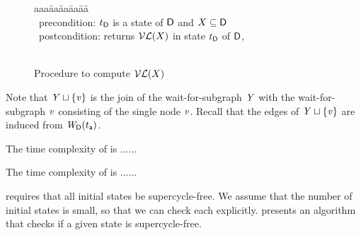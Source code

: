 \begin{figure}[H]
\setcounter{lctr}{0}
\begin{tabbing}\label{alg:compute-lfp}
aaa\= aa\= aa\= aa\= aa\=\kill
{}\\
\cmnt\ precondition: $t_\DS$ is a state of $\dsk{\act}{\l}$ and $X \sub \dsk{\act}{\l}$\\
\cmnt\ postcondition: returns $\lVF{X}$ in state $t_\DS$ of $\dsk{\act}{\l}$,\\
\\
\lio{\YS \gts \ewfg}

\lio{\FORALLC{\ndv \in \dsk{\act}{\l}}}




    \lit{\FI}
\lio{\ENDFOR;}
\lion{\RETURNE{\YS}}
\end{tabbing}
\caption{Procedure to compute $\lVF{X}$}
\label{fig:algcomputeVL}
\end{figure}

Note that $\YS \join \set{\ndv}$ is the join of the wait-for-subgraph $\YS$ with the 
wait-for-subgraph $\ndv$ consisting of the single node $\ndv$. Recall
that the edges of $\YS \join \set{\ndv}$ are induced from $\lwfg{B}{t_\act}{\DS}$.

The time complexity of  is ......

The time complexity of  is ......






 requires that all initial states be supercycle-free. 
We assume that the number of initial states is small, so that we can check each explicitly. 
  presents an algorithm that checks if a
given state is supercycle-free.

